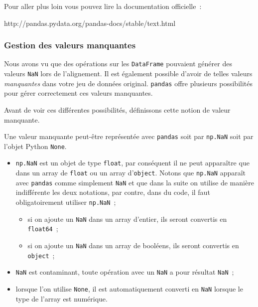     Pour aller plus loin vous pouvez lire la documentation officielle~:

http://pandas.pydata.org/pandas-docs/stable/text.html

    \hypertarget{gestion-des-valeurs-manquantes}{%
\subsubsection{Gestion des valeurs
manquantes}\label{gestion-des-valeurs-manquantes}}

    Nous avons vu que des opérations sur les \texttt{DataFrame} pouvaient
générer des valeurs \texttt{NaN} lors de l'alignement. Il est également
possible d'avoir de telles valeurs \emph{manquantes} dans votre jeu de
données original. \texttt{pandas} offre plusieurs possibilités pour
gérer correctement ces valeurs manquantes.

    Avant de voir ces différentes possibilités, définissons cette notion de
valeur manquante.

Une valeur manquante peut-être représentée avec \texttt{pandas} soit par
\texttt{np.NaN} soit par l'objet Python \texttt{None}.

\begin{itemize}
\tightlist
\item
  \texttt{np.NaN} est un objet de type \texttt{float}, par conséquent il
  ne peut apparaître que dans un array de \texttt{float} ou un array
  d'\texttt{object}. Notons que \texttt{np.NaN} apparaît avec
  \texttt{pandas} comme simplement \texttt{NaN} et que dans la suite on
  utilise de manière indifférente les deux notations, par contre, dans
  du code, il faut obligatoirement utiliser \texttt{np.NaN}~;

  \begin{itemize}
  \tightlist
  \item
    si on ajoute un \texttt{NaN} dans un array d'entier, ils seront
    convertis en \texttt{float64}~;
  \item
    si on ajoute un \texttt{NaN} dans un array de booléens, ils seront
    convertis en \texttt{object}~;
  \end{itemize}
\item
  \texttt{NaN} est contaminant, toute opération avec un \texttt{NaN} a
  pour résultat \texttt{NaN}~;
\item
  lorsque l'on utilise \texttt{None}, il est automatiquement converti en
  \texttt{NaN} lorsque le type de l'array est numérique.
\end{itemize}

